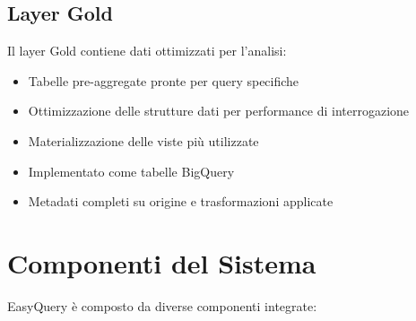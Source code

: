 \documentclass[11pt,a4paper,twoside]{report}
\begin{document}
\subsection{Layer Gold}
Il layer Gold contiene dati ottimizzati per l'analisi:
\begin{itemize}
    \item Tabelle pre-aggregate pronte per query specifiche
    \item Ottimizzazione delle strutture dati per performance di interrogazione
    \item Materializzazione delle viste più utilizzate
    \item Implementato come tabelle BigQuery
    \item Metadati completi su origine e trasformazioni applicate
\end{itemize}

\section{Componenti del Sistema}
EasyQuery è composto da diverse componenti integrate:
\end{document}
